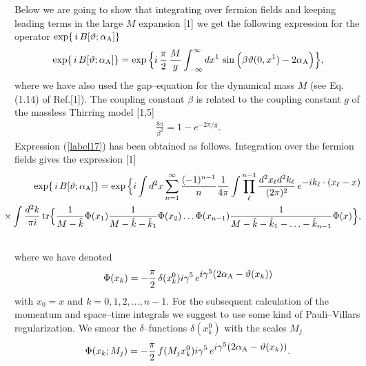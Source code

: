 \documentclass[a4paper,12pt] {article}
\begin{document}
Below we are going to show that integrating over fermion fields and
keeping leading terms in the large $M$ expansion [1] we get the
following expression for the operator $\exp\{\,i\,B[\vartheta;
\alpha_{\rm A}]\}$
%
\begin{eqnarray}\label{label17}
\exp\{\,i\,B[\vartheta; \alpha_{\rm A}]\} =
\exp\Big\{i\,\frac{\pi}{2}\,\frac{M}{g}
\int^{\infty}_{-\infty}dx^1\,\sin\Big(\beta\vartheta(0,x^1) -
2\alpha_{\rm A}\Big)\Big\},
\end{eqnarray}
%
where we have also used the gap--equation for the dynamical mass $M$
(see Eq.(1.14) of Ref.[1]). The coupling constant $\beta$ is related
to the coupling constant $g$ of the massless Thirring model [1,5]
%
\begin{eqnarray}\label{label18}
\frac{8\pi}{\beta^2} = 1 - e^{\textstyle - 2\pi/g}.
\end{eqnarray}
%
Expression (\ref{label17}) has been obtained as follows.  Integration
over the fermion fields gives the expression [1]
%
\begin{eqnarray}\label{label19}
\hspace{-0.3in}&& \exp\{\,i\,B[\vartheta; \alpha_{\rm A}]\} =
\exp\Big\{i\int
d^2x\sum^{\infty}_{n=1}\frac{(-1)^{n-1}}{n}\frac{1}{4\pi}\int
\prod^{n-1}_{\ell}\frac{d^2x_{\ell}d^2k_{\ell}}{(2\pi)^2}\,e^{\textstyle
-ik_{\ell}\cdot(x_{\ell} - x)} \nonumber\\
\hspace{-0.3in}&&\times\int\frac{d^2k}{\pi i}\,{\rm
tr}\Big\{\frac{1}{M - \hat{k}}\Phi(x_1)\frac{1}{M - \hat{k} -
\hat{k}_1}\Phi(x_2)\ldots\Phi(x_{n-1})\frac{1}{M - \hat{k} -
\hat{k}_1 - \ldots - \hat{k}_{n-1}}\Phi(x)\Big\},\nonumber\\
\hspace{-0.3in}&&
\end{eqnarray}
%
where we have denoted
%
\begin{eqnarray}\label{label20}
\Phi(x_k) = -\frac{\pi}{2}\,\delta(x^0_k)i\gamma^5\, e^{\textstyle
i\gamma^5(2\alpha_{\rm A} - \vartheta(x_k))}
\end{eqnarray}
%
with $x_0 = x$ and $k = 0,1,2,\ldots, n-1$. For the subsequent
calculation of the momentum and space--time integrals we suggest to
use some kind of Pauli--Villars regularization. We smear the
$\delta$--functions $\delta(x^0_k)$ with the scales $M_j$
%
\begin{eqnarray}\label{label21}
\Phi(x_k; M_j) = -\frac{\pi}{2}\,f(M_jx^0_k)i\gamma^5\, e^{\textstyle
i\gamma^5(2\alpha_{\rm A} - \vartheta(x_k))}.
\end{eqnarray}
\end{document}
